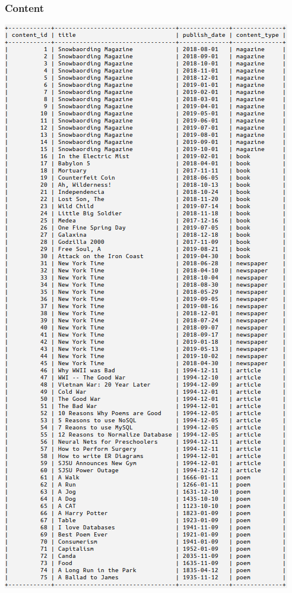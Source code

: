 \documentclass[letter, 12pt, titlepage]{article}
\begin{document}
\subsubsection{Content}
\includegraphics[scale=.6]{content.png}
\end{document}
